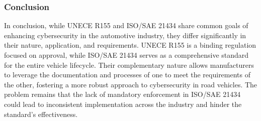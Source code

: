 \subsubsection{Conclusion}\label{subsubsec:conclusion2}

In conclusion, while UNECE R155 and ISO/SAE 21434 share common goals of enhancing cybersecurity in the automotive industry, they differ significantly in their nature, application, and requirements.
UNECE R155 is a binding regulation focused on approval, while ISO/SAE 21434 serves as a comprehensive standard for the entire vehicle lifecycle.
Their complementary nature allows manufacturers to leverage the documentation and processes of one to meet the requirements of the other,
fostering a more robust approach to cybersecurity in road vehicles\cite{comparison-standard}.
The problem remains that the lack of mandatory enforcement in ISO/SAE 21434 could lead to inconsistent implementation across the industry and hinder the standard's effectiveness.